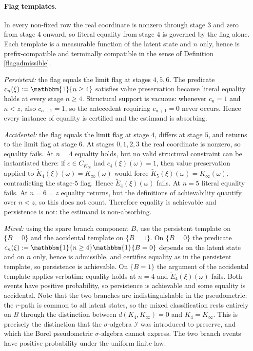 \documentclass{article}
\newcommand{\I}{\mathcal{I}}
\newcommand{\1}{\mathbbm{1}}
\begin{document}
\paragraph{Flag templates.} In every non-fixed row the real coordinate is nonzero through stage
$3$ and zero from stage $4$ onward, so literal equality from stage $4$ is governed by the flag
alone. Each template is a measurable function of the latent state and $n$ only, hence is
prefix-compatible and terminally compatible in the sense of Definition \ref{flagadmissible}.

\emph{Persistent:} the flag equals the limit flag at stages $4,5,6$. The predicate
$c_n(\xi):=\1\{n\ge4\}$ satisfies value preservation because literal equality holds at every stage
$n\ge4$. Structural support is vacuous: whenever $c_n=1$ and $n<z$, also $c_{n+1}=1$, so the
antecedent requiring $c_{n+1}=0$ never occurs. Hence every instance of equality is certified and the
estimand is absorbing.

\emph{Accidental:} the flag equals the limit flag at stage $4$, differs at stage $5$, and returns
to the limit flag at stage $6$. At stages $0,1,2,3$ the real coordinate is nonzero, so equality
fails. At $n=4$ equality holds, but no valid structural constraint can be instantiated
there: if $c\in C_{K_\infty}$ had $c_4(\xi)(\omega)=1$, then value preservation applied to
$\widetilde K_4(\xi)(\omega)=K_\infty(\omega)$ would force
$\widetilde K_5(\xi)(\omega)=K_\infty(\omega)$, contradicting the stage-$5$ flag. Hence
$\widetilde E_4(\xi)(\omega)$ fails. At $n=5$ literal equality fails. At $n=6=z$ equality returns,
but the definitions of achievability quantify over $n<z$, so this does not count. Therefore equality
is achievable and persistence is not: the estimand is non-absorbing.

\emph{Mixed:} using the spare branch component $B$, use the persistent template on $\{B=0\}$ and
the accidental template on $\{B=1\}$. On $\{B=0\}$ the predicate
$c_n(\xi):=\1\{n\ge4\}\1\{B=0\}$ depends on the latent state and on $n$ only, hence is admissible,
and certifies equality as in the persistent template, so persistence is achievable. On $\{B=1\}$ the
argument of the accidental template applies verbatim: equality holds at $n=4$ and
$\widetilde E_4(\xi)(\omega)$ fails. Both events have positive probability, so persistence is
achievable and some equality is accidental. Note that the two branches are indistinguishable in the
pseudometric: the $r$-path is common to all latent states, so the mixed classification rests
entirely on $B$ through the distinction between $d(K_4,K_\infty)=0$ and $K_4=K_\infty$. This is
precisely the distinction that the $\sigma$-algebra $\I$ was introduced to preserve, and which the
Borel pseudometric $\sigma$-algebra cannot express. The two branch events have positive probability
under the uniform finite law.
\end{document}
